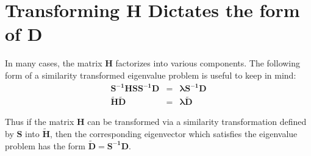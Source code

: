 \documentclass{revtex4}
\begin{document}
\section{Transforming H Dictates the form of D}
In many cases, the matrix $\mathbf{H}$ factorizes into various components. The following
form of a similarity transformed eigenvalue problem is useful to keep in mind:
\begin{eqnarray}
  \mathbf{S^{-1} H S S^{-1} D} &=& \mathbf{\lambda S^{-1} D} \\
  \mathbf{\tilde H \tilde D} &=& \mathbf{\lambda \tilde D}   
\end{eqnarray} 

Thus if the matrix $\mathbf{H}$ can be transformed via a similarity transformation defined
by $\mathbf{S}$ into $\mathbf{\tilde H}$, then the corresponding eigenvector which satisfies the 
eigenvalue problem
has the form $\mathbf{\tilde D} = \mathbf{S^{-1}D}$.
\end{document}
